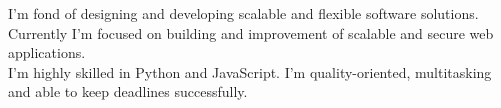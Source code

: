 \documentclass[9pt]{developercv} %
\begin{document}
\vspace{0.5cm}



\begin{minipage}[t]{0.4\textwidth} %
	\vspace{-\baselineskip} %
	
	I'm fond of designing and developing scalable and flexible software solutions. Currently I'm focused on building and improvement of scalable and secure web applications.\\ I'm highly skilled in Python and JavaScript. I'm quality-oriented, multitasking and able to keep deadlines successfully. %
\end{minipage}
\hfill %
\begin{minipage}[t]{0.5\textwidth} %
	\vspace{-\baselineskip} %
	\begin{barchart}{5.5}
	\end{barchart}
\end{minipage}

\begin{center}
\end{center}


\end{document}
